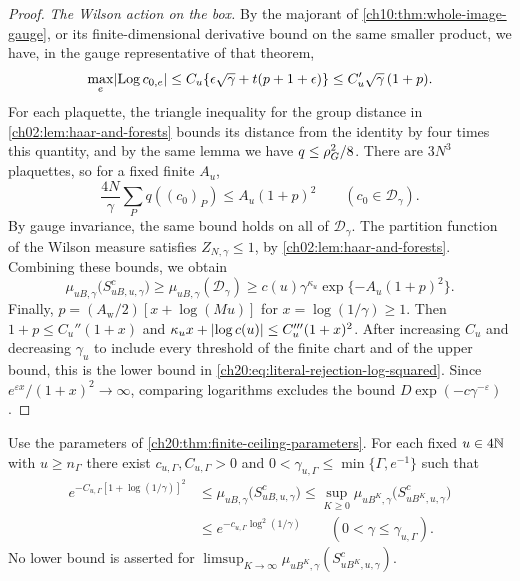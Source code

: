 \begin{proof}
\emph{The Wilson action on the box.} By the majorant of \cref{ch10:thm:whole-image-gauge}, or its finite-dimensional derivative bound on the same smaller product, we have, in the gauge representative of that theorem,
\[
 \max_e\lvert \operatorname{Log} c_{0,e}\rvert\le C_u\{\epsilon\sqrt\gamma+t(p+1+\epsilon)\}\le C_u'\sqrt\gamma\,(1+p).
\]
For each plaquette, the triangle inequality for the group distance in \cref{ch02:lem:haar-and-forests} bounds its distance from the identity by four times this quantity, and by the same lemma we have $q\le\rho_G^2/8$. There are $3N^3$ plaquettes, so for a fixed finite $A_u$,
\[
 \frac{4N}\gamma\sum_Pq((c_0)_P)\le A_u(1+p)^2\qquad(c_0\in\mathcal D_\gamma).
\]
By gauge invariance, the same bound holds on all of $\mathcal D_\gamma$. The partition function of the Wilson measure satisfies $Z_{N,\gamma}\le1$, by \cref{ch02:lem:haar-and-forests}. Combining these bounds, we obtain
\[
 \mu_{uB,\gamma}\bigl(S_{uB,u,\gamma}^c\bigr)\ge\mu_{uB,\gamma}(\mathcal D_\gamma)\ge c(u)\gamma^{\kappa_u}\exp\{-A_u(1+p)^2\}.
\]
Finally, $p=(A_{\mathrm w}/2)[x+\log(Mu)]$ for $x=\log(1/\gamma)\ge1$. Then $1+p\le C_u''(1+x)$ and $\kappa_ux+\lvert \log c(u)\rvert\le C_u'''(1+x)^2$. After increasing $C_u$ and decreasing $\gamma_u$ to include every threshold of the finite chart and of the upper bound, this is the lower bound in \eqref{ch20:eq:literal-rejection-log-squared}. Since $e^{\varepsilon x}/(1+x)^2\to\infty$, comparing logarithms excludes the bound $D\exp(-c\gamma^{-\varepsilon})$.
\end{proof}

\begin{corollary}\label{ch20:cor:finite-ceiling-rejection-order}
Use the parameters of \cref{ch20:thm:finite-ceiling-parameters}. For each fixed $u\in4\mathbb N$ with $u\ge n_\Gamma$ there exist $c_{u,\Gamma},C_{u,\Gamma}>0$ and $0<\gamma_{u,\Gamma}\le\min\{\Gamma,e^{-1}\}$ such that
\[
 \begin{split}
 e^{-C_{u,\Gamma}[1+\log(1/\gamma)]^2}&\le\mu_{uB,\gamma}\bigl(S_{uB,u,\gamma}^c\bigr)\le\sup_{K\ge0}\mu_{uB^K,\gamma}\bigl(S_{uB^K,u,\gamma}^c\bigr)\\
 &\le e^{-c_{u,\Gamma}\log^2(1/\gamma)}\qquad(0<\gamma\le\gamma_{u,\Gamma}).
 \end{split}
\]
No lower bound is asserted for $\limsup_{K\to\infty}\mu_{uB^K,\gamma}(S_{uB^K,u,\gamma}^c)$.
\end{corollary}

